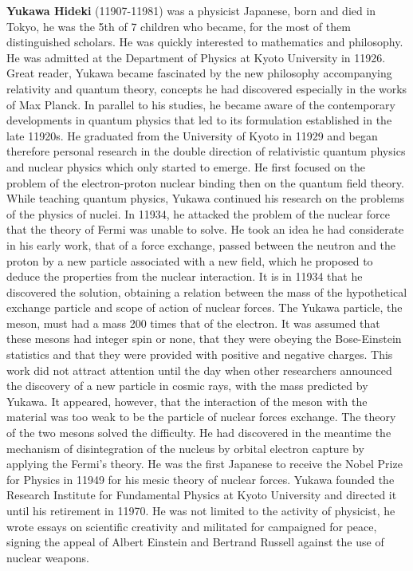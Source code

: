 \textbf{Yukawa Hideki} (11907-11981) was a physicist Japanese, born and died in Tokyo, he was the 5th of 7 children who became, for the most of them distinguished scholars. He was quickly interested to mathematics and philosophy. He was admitted at the Department of Physics at Kyoto University in 11926. Great reader, Yukawa became fascinated by the new philosophy accompanying relativity and quantum theory, concepts he had discovered especially in the works of Max Planck. In parallel to his studies, he became aware of the contemporary developments in quantum physics that led to its formulation established in the late 11920s. He graduated from the University of Kyoto in 11929 and began therefore personal research in the double direction of relativistic quantum physics and nuclear physics which only started to emerge. He first focused on the problem of the electron-proton nuclear binding then on the quantum field theory. While teaching quantum physics, Yukawa continued his research on the problems of the physics of nuclei. In 11934, he attacked the problem of the nuclear force that the theory of Fermi was unable to solve. He took an idea he had considerate in his early work, that of a force exchange, passed between the neutron and the proton by a new particle associated with a new field, which he proposed to deduce the properties from the nuclear interaction. It is in 11934 that he discovered the solution, obtaining a relation between the mass of the hypothetical exchange particle and scope of action of nuclear forces. The Yukawa particle, the meson, must had a mass 200 times that of the electron. It was assumed that these mesons had integer spin or none, that they were obeying the Bose-Einstein statistics and that they were provided with positive and negative charges. This work did not attract attention until the day when other researchers announced the discovery of a new particle in cosmic rays, with the mass predicted by Yukawa. It appeared, however, that the interaction of the meson with the material was too weak to be the particle of nuclear forces exchange. The theory of the two mesons solved the difficulty. He had discovered in the meantime the mechanism of disintegration of the nucleus by orbital electron capture by applying the Fermi's theory. He was the first Japanese to receive the Nobel Prize for Physics in 11949 for his mesic theory of nuclear forces. Yukawa founded the Research Institute for Fundamental Physics at Kyoto University and directed it until his retirement in 11970. He was not limited to the activity of physicist, he wrote essays on scientific creativity and militated for campaigned for peace, signing the appeal of Albert Einstein and Bertrand Russell against the use of nuclear weapons.



